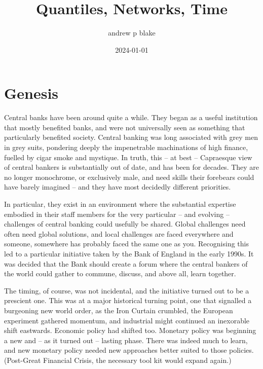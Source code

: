 \documentclass[
  letterpaper,
]{book}
\title{Quantiles, Networks, Time}
\author{andrew p blake}
\date{2024-01-01}
\renewcommand*\contentsname{Table of contents}
\newcommand\contentsname{Table of contents}
\begin{document}
\frontmatter
\maketitle
\ifdefined\Shaded\renewenvironment{Shaded}{\begin{tcolorbox}[borderline west={3pt}{0pt}{shadecolor}, sharp corners, interior hidden, breakable, boxrule=0pt, enhanced, frame hidden]}{\end{tcolorbox}}\fi

\renewcommand*\contentsname{Table of contents}
{
\setcounter{tocdepth}{2}
\tableofcontents
}
\listoffigures
\listoftables
\mainmatter
{}

\hypertarget{sec-genesis}{%
\chapter*{Genesis}\label{sec-genesis}}


Central banks have been around quite a while. They began as a useful
institution that mostly benefited banks, and were not universally seen
as something that particularly benefited society. Central banking was
long associated with grey men in grey suits, pondering deeply the
impenetrable machinations of high finance, fuelled by cigar smoke and
mystique. In truth, this -- at best -- Capraesque view of central
bankers is substantially out of date, and has been for decades. They are
no longer monochrome, or exclusively male, and need skills their
forebears could have barely imagined -- and they have most decidedly
different priorities.

In particular, they exist in an environment where the substantial
expertise embodied in their staff members for the very particular -- and
evolving -- challenges of central banking could usefully be shared.
Global challenges need often need global solutions, and local challenges
are faced everywhere and someone, somewhere has probably faced the same
one as you. Recognising this led to a particular initiative taken by the
Bank of England in the early 1990s. It was decided that the Bank should
create a forum where the central bankers of the world could gather to
commune, discuss, and above all, learn together.

The timing, of course, was not incidental, and the initiative turned out
to be a prescient one. This was at a major historical turning point, one
that signalled a burgeoning new world order, as the Iron Curtain
crumbled, the European experiment gathered momentum, and industrial
might continued an inexorable shift eastwards. Economic policy had
shifted too. Monetary policy was beginning a new and -- as it turned out
-- lasting phase. There was indeed much to learn, and new monetary
policy needed new approaches better suited to those policies.
(Post-Great Financial Crisis, the necessary tool kit would expand
again.)
\end{document}

